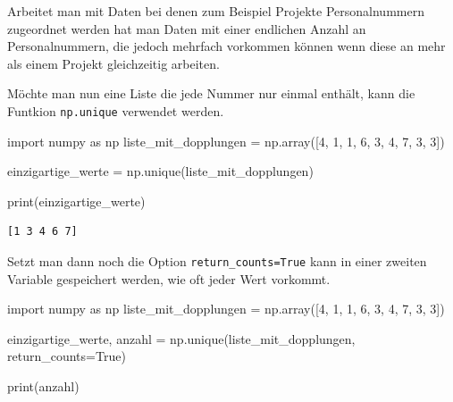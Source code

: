 \documentclass[
  letterpaper,
  DIV=11,
  numbers=noendperiod]{scrreprt}
\newenvironment{Shaded}{\begin{snugshade}}{\end{snugshade}}
\newcommand{\BuiltInTok}[1]{\textcolor[rgb]{0.00,0.23,0.31}{#1}}
\newcommand{\DecValTok}[1]{\textcolor[rgb]{0.68,0.00,0.00}{#1}}
\newcommand{\ImportTok}[1]{\textcolor[rgb]{0.00,0.46,0.62}{#1}}
\newcommand{\NormalTok}[1]{\textcolor[rgb]{0.00,0.23,0.31}{#1}}
\newcommand{\OperatorTok}[1]{\textcolor[rgb]{0.37,0.37,0.37}{#1}}
\newcommand{\VariableTok}[1]{\textcolor[rgb]{0.07,0.07,0.07}{#1}}
\begin{document}
Arbeitet man mit Daten bei denen zum Beispiel Projekte Personalnummern
zugeordnet werden hat man Daten mit einer endlichen Anzahl an
Personalnummern, die jedoch mehrfach vorkommen können wenn diese an mehr
als einem Projekt gleichzeitig arbeiten.

Möchte man nun eine Liste die jede Nummer nur einmal enthält, kann die
Funtkion \texttt{np.unique} verwendet werden.

\begin{Shaded}
\begin{Highlighting}[]
\ImportTok{import}\NormalTok{ numpy }\ImportTok{as}\NormalTok{ np}
\NormalTok{liste\_mit\_dopplungen }\OperatorTok{=}\NormalTok{ np.array([}\DecValTok{4}\NormalTok{, }\DecValTok{1}\NormalTok{, }\DecValTok{1}\NormalTok{, }\DecValTok{6}\NormalTok{, }\DecValTok{3}\NormalTok{, }\DecValTok{4}\NormalTok{, }\DecValTok{7}\NormalTok{, }\DecValTok{3}\NormalTok{, }\DecValTok{3}\NormalTok{])}

\NormalTok{einzigartige\_werte }\OperatorTok{=}\NormalTok{ np.unique(liste\_mit\_dopplungen)}

\BuiltInTok{print}\NormalTok{(einzigartige\_werte)}
\end{Highlighting}
\end{Shaded}

\begin{verbatim}
[1 3 4 6 7]
\end{verbatim}

Setzt man dann noch die Option \texttt{return\_counts=True} kann in
einer zweiten Variable gespeichert werden, wie oft jeder Wert vorkommt.

\begin{Shaded}
\begin{Highlighting}[]
\ImportTok{import}\NormalTok{ numpy }\ImportTok{as}\NormalTok{ np}
\NormalTok{liste\_mit\_dopplungen }\OperatorTok{=}\NormalTok{ np.array([}\DecValTok{4}\NormalTok{, }\DecValTok{1}\NormalTok{, }\DecValTok{1}\NormalTok{, }\DecValTok{6}\NormalTok{, }\DecValTok{3}\NormalTok{, }\DecValTok{4}\NormalTok{, }\DecValTok{7}\NormalTok{, }\DecValTok{3}\NormalTok{, }\DecValTok{3}\NormalTok{])}

\NormalTok{einzigartige\_werte, anzahl }\OperatorTok{=}\NormalTok{ np.unique(liste\_mit\_dopplungen, return\_counts}\OperatorTok{=}\VariableTok{True}\NormalTok{)}

\BuiltInTok{print}\NormalTok{(anzahl)}
\end{Highlighting}
\end{Shaded}
\end{document}
